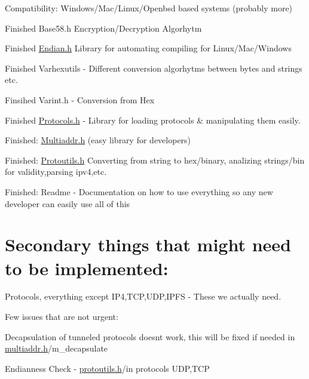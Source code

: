 
\begin{DoxyItemize}
\item Compatibility\+: Windows/\+Mac/\+Linux/\+Openbsd based systems (probably more)
\item Finished Base58.\+h Encryption/\+Decryption Algorhytm
\item Finished \mbox{\hyperlink{endian_8h_source}{Endian.\+h}} Library for automating compiling for Linux/\+Mac/\+Windows
\item Finished Varhexutils -\/ Different conversion algorhytms between bytes and strings etc.
\item Finsihed Varint.\+h -\/ Conversion from Hex
\item Finished \mbox{\hyperlink{protocols_8h_source}{Protocols.\+h}} -\/ Library for loading protocols \& manipulating them easily.
\item Finished\+: \mbox{\hyperlink{multiaddr_8h_source}{Multiaddr.\+h}} (easy library for developers)
\item Finished\+: \mbox{\hyperlink{protoutils_8h_source}{Protoutils.\+h}} Converting from string to hex/binary, analizing strings/bin for validity,parsing ipv4,etc.
\item Finished\+: Readme -\/ Documentation on how to use everything so any new developer can easily use all of this \section*{Secondary things that might need to be implemented\+:}
\end{DoxyItemize}


\begin{DoxyItemize}
\item Protocols, everything except I\+P4,T\+CP,U\+DP,I\+P\+FS -\/ These we actually need.
\item Few issues that are not urgent\+:
\begin{DoxyItemize}
\item Decapsulation of tunneled protocols doesn\textquotesingle{}t work, this will be fixed if needed in \mbox{\hyperlink{multiaddr_8h_source}{multiaddr.\+h}}/m\+\_\+decapsulate
\item Endianness Check -\/ \mbox{\hyperlink{protoutils_8h_source}{protoutils.\+h}}/in protocols U\+DP,T\+CP 
\end{DoxyItemize}
\end{DoxyItemize}